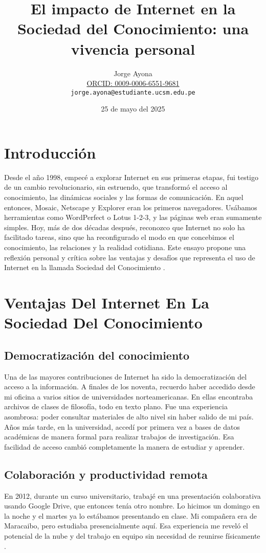 \documentclass[12pt]{article}
\title{El impacto de Internet en la Sociedad del Conocimiento: una vivencia personal}
\author{Jorge Ayona\\
	{\footnotesize \protect\href{https://orcid.org/0009-0006-6551-9681}{ORCID: 0009-0006-6551-9681}}\\
	\texttt{jorge.ayona@estudiante.ucsm.edu.pe}}
\date{25 de mayo del 2025}
\begin{document}
	\maketitle
	\newpage
	\onehalfspacing
	
	\section{Introducción}
	
	Desde el año 1998, empecé a explorar Internet en sus primeras etapas, fui testigo de un cambio revolucionario, sin estruendo, que transformó el acceso al conocimiento, las dinámicas sociales y las formas de comunicación. En aquel entonces, Mosaic, Netscape y Explorer eran los primeros navegadores. Usábamos herramientas como WordPerfect o Lotus 1-2-3, y las páginas web eran sumamente simples. Hoy, más de dos décadas después, reconozco que Internet no solo ha facilitado tareas, sino que ha reconfigurado el modo en que concebimos el conocimiento, las relaciones y la realidad cotidiana. Este ensayo propone una reflexión personal y crítica sobre las ventajas y desafíos que representa el uso de Internet en la llamada Sociedad del Conocimiento \parencite{castells2000}.
	
	\section{Ventajas Del Internet En La Sociedad Del Conocimiento}
	
	\subsection{Democratización del conocimiento}
	Una de las mayores contribuciones de Internet ha sido la democratización del acceso a la información. A finales de los noventa, recuerdo haber accedido desde mi oficina a varios sitios de universidades norteamericanas. En ellas encontraba archivos de clases de filosofía, todo en texto plano. Fue una experiencia asombrosa: poder consultar materiales de alto nivel sin haber salido de mi país. Años más tarde, en la universidad, accedí por primera vez a bases de datos académicas de manera formal para realizar trabajos de investigación. Esa facilidad de acceso cambió completamente la manera de estudiar y aprender.
	
	\subsection{Colaboración y productividad remota}
	En 2012, durante un curso universitario, trabajé en una presentación colaborativa usando Google Drive, que entonces tenía otro nombre. Lo hicimos un domingo en la noche y el martes ya lo estábamos presentando en clase. Mi compañera era de Maracaibo, pero estudiaba presencialmente aquí. Esa experiencia me reveló el potencial de la nube y del trabajo en equipo sin necesidad de reunirse físicamente \parencite{googleworkspace}.
	
\end{document}
